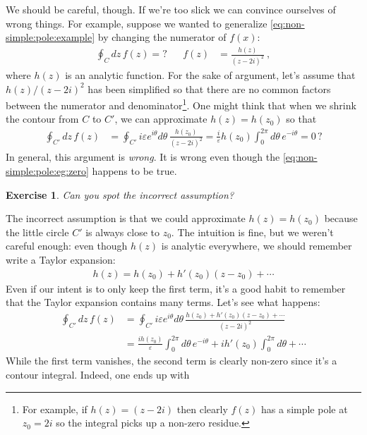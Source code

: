 \documentclass[
  11pt,
	colorful,
	raggedright,
]{tufte-style-thesis-flip}
\newtheorem{exercise}{Exercise}[section]
\begin{document}
We should be careful, though. If we're too slick we can convince ourselves of wrong things. For example, suppose we wanted to generalize \eqref{eq:non-simple:pole:example} by changing the numerator of $f(x)$:
\begin{align}
  \oint_C dz \, f(z) = ?
  &&
  f(z) &= \frac{h(z)}{(z-2i)^2} \ ,
  \label{eq:non-simple:pole:example:hz}
\end{align}
where $h(z)$ is an analytic function. For the sake of argument, let's assume that $h(z)/(z-2i)^2$ has been simplified so that there are no common factors between the numerator and denominator\footnote{For example, if $h(z)=(z-2i)$ then clearly $f(z)$ has a simple pole at $z_0=2i$ so the integral picks up a non-zero residue.}. One might think that when we shrink the contour from $C$ to $C'$, we can approximate $h(z)= h(z_0)$ so that
\begin{align}
  \oint_{C'}dz\, f(z)
  &=
  \oint_{C'} i\varepsilon e^{i\theta}d\theta\, 
  \frac{h(z_0)}{\left(z-2i\right)^2}
  =
  \frac{i}{\varepsilon}h(z_0)
  \int_0^{2\pi} d\theta\, 
  e^{-i\theta}
  = 0\,?
\end{align}
In general, this argument is \emph{wrong}. It is wrong even though the \eqref{eq:non-simple:pole:eg:zero} happens to be true. 
\begin{exercise}
Can you spot the incorrect assumption?
\end{exercise}
The incorrect assumption is that we could approximate $h(z) = h(z_0)$ because the little circle $C'$ is always close to $z_0$. The intuition is fine, but we weren't careful enough: even though $h(z)$ is analytic everywhere, we should remember write a Taylor expansion:
\begin{align}
  h(z) = h(z_0) + h'(z_0)(z-z_0) + \cdots
\end{align}
Even if our intent is to only keep the first term, it's a good habit to remember that the Taylor expansion contains many terms. Let's see what happens: 
\begin{align}
  \oint_{C'}dz\, f(z)
  &=
  \oint_{C'} i\varepsilon e^{i\theta}d\theta\, 
  \frac{h(z_0)+ h'(z_0)(z-z_0) + \cdots}{\left(z-2i\right)^2}
  \\
  &
  =
  \frac{ih(z_0)}{\varepsilon}
  \int_0^{2\pi} d\theta\, 
  e^{-i\theta}
  +
  {ih'(z_0)}
  \int_0^{2\pi} d\theta
  +\cdots
  \label{eq:non-simple:pole:example:hz:punchline}
\end{align}
While the first term vanishes, the second term is clearly non-zero since it's a contour integral. Indeed, one ends up with
\end{document}
